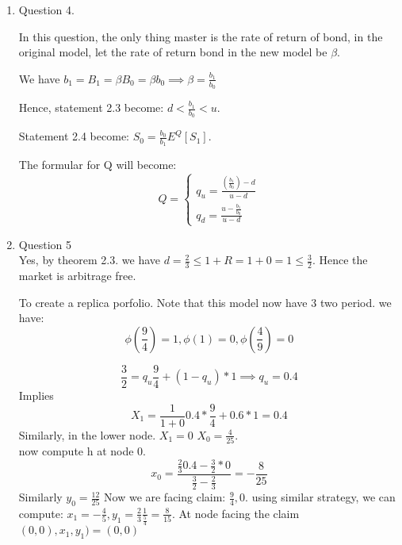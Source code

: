 \documentclass[]{book}
\theoremstyle{definition}
\begin{document}
\begin{enumerate}
\begin{proof}
From definition 2.4, we have: $S_0=s = \frac{1}{1+R}E^{Q}[S_1] = \frac{1}{1+R}\left[q_usu+q_dsd \right] =  \frac{1}{1+R}\left[q_usu+ (1-q_u)sd\right] = \frac{1}{1+R}\left[q_usu+ (1-q_u)sd\right] \implies 1+R = q_u(u-d) + d\implies q_u = \frac{(1+R)-d}{u-d}$.\\
Symmetric argument, $q_d = \frac{(u-1+R)}{u-d}$

\end{proof}

\begin{proof}
WLOG, suppose $X_1<X = \phi(Z)$ We can get "free money" by buying the contingentcy plan at price $X_1<\phi(Z)$ and recieve $\phi(Z)>X_1$
\end{proof}

\item Question 4.

In this question, the only thing master is the rate of return of bond, in the original model, let the rate of return bond in the new model be $\beta$.

We have $b_1=B_1 = \beta B_0 = \beta b_0 \implies  \beta = \frac{b_1}{b_0}$

Hence, statement 2.3 become: $d<\frac{b_1}{b_0}<u$.

Statement 2.4 become: $S_0= \frac{b_0}{b_1}E^{Q}[S_1]$.

The formular for Q will become:\\ 
\begin{equation*}
 Q = \left\{
        \begin{array}{ll}
            q_u = \frac{(\frac{b_1}{b_0})-d}{u-d}\\
            q_d = \frac{u-\frac{b_1}{b_0}}{u-d}
        \end{array}
    \right.
\end{equation*}
\item Question 5\\
Yes, by theorem 2.3. we have $d=\frac{2}{3} \leq 1+R =1+0=1 \leq \frac{3}{2}$. Hence the market is arbitrage free.

To create a replica porfolio. Note that this model now have 3 two period.
we have:
$$\phi(\frac{9}{4}) = 1, \phi(1) = 0 , \phi(\frac{4}{9})= 0$$


$$\frac{3}{2} = q_u \frac{9}{4} +(1-q_u)*1 \implies q_u = 0.4$$
Implies $$X_1 = \frac{1}{1+0}0.4 * \frac{9}{4} + 0.6*1 = 0.4$$
Similarly, in the lower node. $X_1 = 0$
$X_0 = \frac{4}{25}$.\\

now compute h at node 0.
$$x_0 = \frac{\frac{2}{3}0.4-\frac{3}{2}*0}{\frac{3}{2}-\frac{2}{3}} = -\frac{8}{25}$$
Similarly $y_0 = \frac{12}{25}$
Now we are facing claim: $\frac{9}{4}, 0$. using similar strategy, we can compute: $x_1 = -\frac{4}{5},y_1= \frac{2}{3} \frac{1}{\frac{5}{4}} = \frac{8}{15}$.
At node facing the claim $(0,0), x_1,y_1) = (0,0)$












\end{enumerate}
\end{document}
